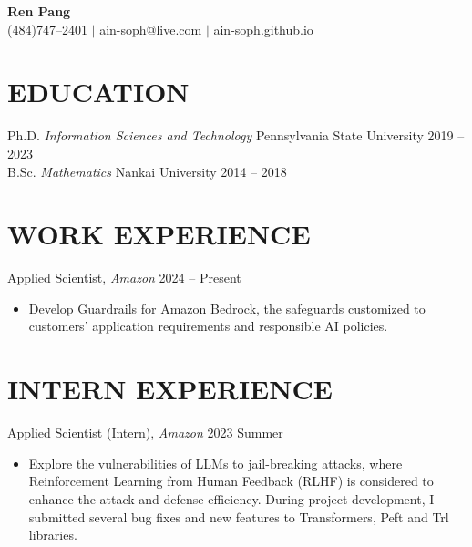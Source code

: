 \documentclass[letterpaper,11pt]{article}
\begin{document}
\begin{center}
    \textbf{\Huge Ren Pang} \\ \vspace{5pt}
    \small \faPhone* (484)747--2401 \hspace{1pt} $|$
    \hspace{1pt} \faEnvelope\hspace{2pt}ain-soph@live.com \hspace{1pt} $|$ 
    \hspace{1pt} \faGithub\hspace{2pt}ain-soph.github.io
    \\ \vspace{0pt}
\end{center}

\section{EDUCATION}
Ph.D. \hspace{1em} \textit{Information Sciences and Technology} \hspace{1em} Pennsylvania State University \hfill 2019 -- 2023 \\
B.Sc. \hspace{1em} \textit{Mathematics} \hspace{11.8em} Nankai University \hfill 2014 -- 2018

\section{WORK EXPERIENCE}

\noindent
Applied Scientist, \textit{Amazon}  \hfill 2024 -- Present
\begin{itemize}
\item[]
\vspace{-5pt} Develop Guardrails for Amazon Bedrock, the safeguards customized to customers' application requirements and responsible AI policies.
\end{itemize}

\section{INTERN EXPERIENCE}

\noindent
Applied Scientist (Intern), \textit{Amazon}  \hfill 2023 Summer
\begin{itemize}
\item[]
\vspace{-5pt}Explore the vulnerabilities of LLMs to jail-breaking attacks, where Reinforcement Learning from Human Feedback (RLHF) is considered to enhance the attack and defense efficiency. During project development, I submitted several bug fixes and new features to Transformers, Peft and Trl libraries.
\end{itemize}
\end{document}
